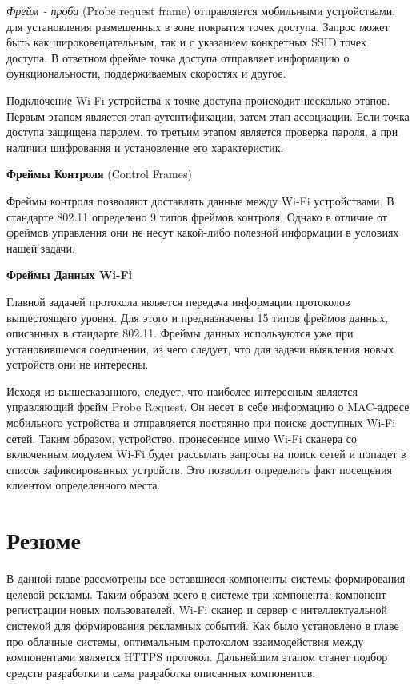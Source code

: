 \textit{Фрейм - проба} (Probe request frame) отправляется мобильными устройствами, для установления размещенных в зоне покрытия точек доступа. Запрос может быть как широковещательным, так и с указанием конкретных SSID точек доступа. В ответном фрейме точка доступа отправляет информацию о функциональности, поддерживаемых скоростях и другое.

Подключение Wi-Fi устройства к точке доступа происходит несколько этапов. Первым этапом является этап аутентификации, затем этап ассоциации. Если точка доступа защищена паролем, то третьим этапом является проверка пароля, а при наличии шифрования и установление его характеристик.

\textbf{Фреймы Контроля} (Control Frames)

Фреймы контроля позволяют доставлять данные между Wi-Fi устройствами. В стандарте 802.11 определено 9 типов фреймов контроля. Однако в отличие от фреймов управления они не несут какой-либо полезной информации в условиях нашей задачи.

\textbf{Фреймы Данных Wi-Fi}

Главной задачей протокола является передача информации протоколов вышестоящего уровня. Для этого и предназначены 15 типов фреймов данных, описанных в стандарте 802.11. Фреймы данных используются уже при установившемся соединении, из чего следует, что для задачи выявления новых устройств они не интересны.

Исходя из вышесказанного, следует, что наиболее интересным является управляющий фрейм Probe Request. Он несет в себе информацию о MAC-адресе мобильного устройства и отправляется постоянно при поиске доступных Wi-Fi сетей. Таким образом, устройство, пронесенное мимо Wi-Fi сканера со включенным модулем Wi-Fi будет рассылать запросы на поиск сетей и попадет в список зафиксированных устройств. Это позволит определить факт посещения клиентом определенного места.


\section{Резюме}

В данной главе рассмотрены все оставшиеся компоненты системы формирования целевой рекламы. Таким образом всего в системе три компонента: компонент регистрации новых пользователей, Wi-Fi сканер и сервер с интеллектуальной системой для формирования рекламных событий. Как было установлено в главе про облачные системы, оптимальным протоколом взаимодействия между компонентами является HTTPS протокол. Дальнейшим этапом станет подбор средств разработки и сама разработка описанных компонентов.
